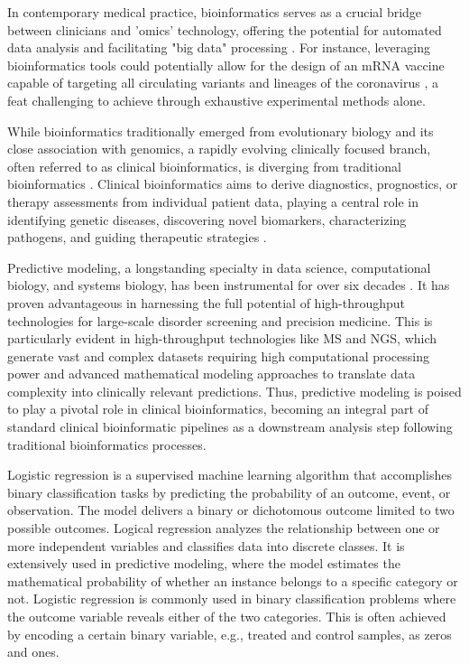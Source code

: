 In contemporary medical practice, bioinformatics serves as a crucial bridge between clinicians and 'omics' technology, offering the potential for automated data analysis and facilitating "big data" processing \citep{maldi-tof}. For instance, leveraging bioinformatics tools could potentially allow for the design of an mRNA vaccine capable of targeting all circulating variants and lineages of the coronavirus \citep{bioinf_corona}, a feat challenging to achieve through exhaustive experimental methods alone.

While bioinformatics traditionally emerged from evolutionary biology and its close association with genomics, a rapidly evolving clinically focused branch, often referred to as clinical bioinformatics, is diverging from traditional bioinformatics \citep{bioinf_clin}. Clinical bioinformatics aims to derive diagnostics, prognostics, or therapy assessments from individual patient data, playing a central role in identifying genetic diseases, discovering novel biomarkers, characterizing pathogens, and guiding therapeutic strategies \citep{bioinf_clin2}.

Predictive modeling, a longstanding specialty in data science, computational biology, and systems biology, has been instrumental for over six decades \citep{pm_bio}. It has proven advantageous in harnessing the full potential of high-throughput technologies for large-scale disorder screening and precision medicine. This is particularly evident in high-throughput technologies like \ac{MS} and \ac{NGS}, which generate vast and complex datasets requiring high computational processing power and advanced mathematical modeling approaches to translate data complexity into clinically relevant predictions. Thus, predictive modeling is poised to play a pivotal role in clinical bioinformatics, becoming an integral part of standard clinical bioinformatic pipelines as a downstream analysis step following traditional bioinformatics processes.

Logistic regression is a supervised machine learning algorithm that accomplishes binary classification tasks by predicting the probability of an outcome, event, or observation. The model delivers a binary or dichotomous outcome limited to two possible outcomes. Logical regression analyzes the relationship between one or more independent variables and classifies data into discrete classes. It is extensively used in predictive modeling, where the model estimates the mathematical probability of whether an instance belongs to a specific category or not. Logistic regression is commonly used in binary classification problems where the outcome variable reveals either of the two categories. This is often achieved by encoding a certain binary variable, e.g., treated and control samples, as zeros and ones.